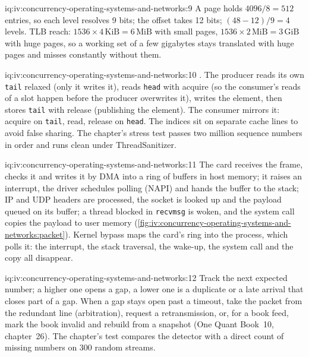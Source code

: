 \begin{solution}{iq:iv:concurrency-operating-systems-and-networks:9}
A page holds $4096/8 = 512$ entries, so each level resolves 9 bits; the offset takes 12 bits; $(48 - 12)/9 = 4$ levels. TLB reach:
$1536 \times 4\,\text{KiB} = 6\,\text{MiB}$ with small pages, $1536 \times 2\,\text{MiB} = 3\,\text{GiB}$ with huge pages, so a
working set of a few gigabytes stays translated with huge pages and misses constantly without them.
\end{solution}

\begin{solution}{iq:iv:concurrency-operating-systems-and-networks:10}
. The producer reads its own \texttt{tail} relaxed (only it writes it),
reads \texttt{head} with acquire (so the consumer's reads of a slot happen before the producer overwrites it), writes the element,
then stores \texttt{tail} with release (publishing the element). The consumer mirrors it: acquire on \texttt{tail}, read, release on
\texttt{head}. The indices sit on separate cache lines to avoid false sharing. The chapter's stress test passes two million sequence
numbers in order and runs clean under ThreadSanitizer.
\end{solution}

\begin{solution}{iq:iv:concurrency-operating-systems-and-networks:11}
The card receives the frame, checks it and writes it by DMA into a ring of buffers in host memory; it raises an interrupt, the
driver schedules polling (NAPI) and hands the buffer to the stack; IP and UDP headers are processed, the socket is looked up and the
payload queued on its buffer; a thread blocked in \texttt{recvmsg} is woken, and the system call copies the payload to user memory
(\cref{fig:iv:concurrency-operating-systems-and-networks:packet}). Kernel bypass maps the card's ring into the process, which polls it:
the interrupt, the stack traversal, the wake-up, the system call and the copy all disappear.
\end{solution}

\begin{solution}{iq:iv:concurrency-operating-systems-and-networks:12}
\label{lst:iv:concurrency-operating-systems-and-networks:gaps}
Track the next expected number; a higher one opens a gap, a lower one is a duplicate or a late arrival that closes part of a gap.
When a gap stays open past a timeout, take the packet from the redundant line (arbitration), request a retransmission, or, for a
book feed, mark the book invalid and rebuild from a snapshot (One Quant Book~10, chapter~26). The chapter's test compares the
detector with a direct count of missing numbers on 300 random streams.
\end{solution}

